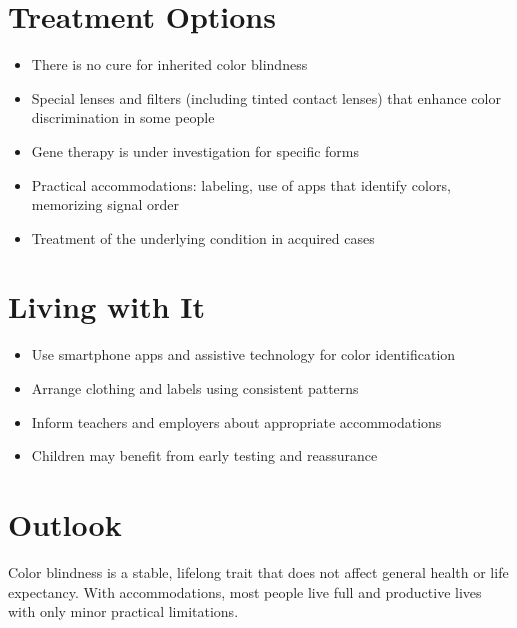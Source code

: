 \section{Treatment Options}
\begin{itemize}[noitemsep]
  \item There is no cure for inherited color blindness
  \item Special lenses and filters (including tinted contact lenses) that enhance color discrimination in some people
  \item Gene therapy is under investigation for specific forms
  \item Practical accommodations: labeling, use of apps that identify colors, memorizing signal order
  \item Treatment of the underlying condition in acquired cases
\end{itemize}
\section{Living with It}
\begin{itemize}[noitemsep]
  \item Use smartphone apps and assistive technology for color identification
  \item Arrange clothing and labels using consistent patterns
  \item Inform teachers and employers about appropriate accommodations
  \item Children may benefit from early testing and reassurance
\end{itemize}
\section{Outlook}
Color blindness is a stable, lifelong trait that does not affect general health or life expectancy. With accommodations, most people live full and productive lives with only minor practical limitations.
